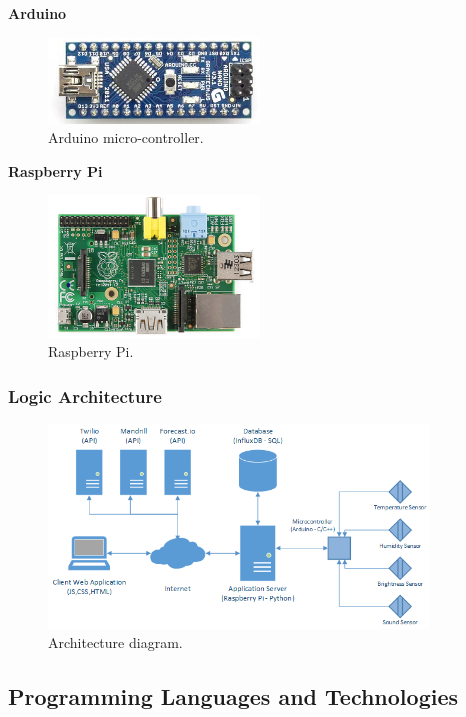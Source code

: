 \documentclass[12pt]{report}
\begin{document}
\textbf{Arduino}

\begin{figure}[H]
    \centering
    \includegraphics[width=0.5\textwidth]{img/arduino.png}
    \caption{Arduino micro-controller.}
    \label{fig:arduino}
\end{figure}

\textbf{Raspberry Pi}

\begin{figure}[H]
    \centering
    \includegraphics[width=0.5\textwidth]{img/rpi.png}
    \caption{Raspberry Pi.}
    \label{fig:rpi}
\end{figure}


\subsubsection{Logic Architecture}

\begin{figure}[H]
    \centering
    \includegraphics[width=0.9\textwidth]{arc.png}
    \caption{Architecture diagram.}
    \label{fig:arc}
\end{figure}

\subsection{Programming Languages and Technologies}
\end{document}
